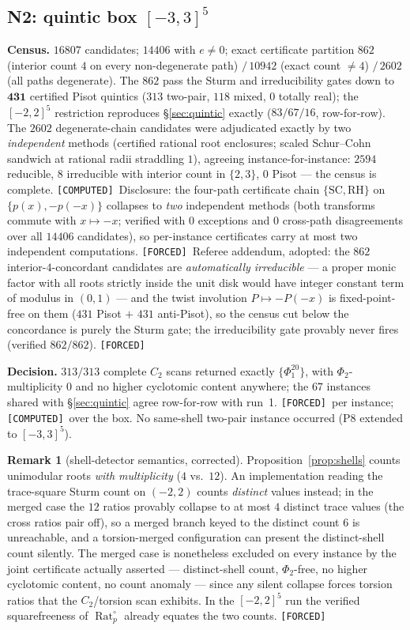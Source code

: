 \documentclass[11pt]{article}
\newcommand{\F}{\textnormal{\texttt{[FORCED]}}}
\newcommand{\C}{\textnormal{\texttt{[COMPUTED]}}}
\newcommand{\Rat}{\operatorname{Rat}}
\theoremstyle{definition}
\newtheorem{remark}[theorem]{Remark}
\begin{document}
\subsection{N2: quintic box $[-3,3]^5$}
\textbf{Census.} $16807$ candidates; $14406$ with $e\neq0$; exact certificate
partition $862$ (interior count $4$ on every non-degenerate path)
$/\,10942$ (exact count $\neq4$) $/\,2602$ (all paths degenerate). The $862$
pass the Sturm and irreducibility gates down to $\mathbf{431}$ certified
Pisot quintics ($313$ two-pair, $118$ mixed, $0$ totally real); the
$[-2,2]^5$ restriction reproduces \S\ref{sec:quintic} exactly ($83/67/16$,
row-for-row). The $2602$ degenerate-chain candidates were adjudicated exactly
by two \emph{independent} methods (certified rational root enclosures;
scaled Schur--Cohn sandwich at rational radii straddling $1$), agreeing
instance-for-instance: $2594$ reducible, $8$ irreducible with interior count
in $\{2,3\}$, $0$ Pisot --- the census is complete. \C\ Disclosure: the
four-path certificate chain $\{\mathrm{SC},\mathrm{RH}\}$ on
$\{p(x),-p(-x)\}$ collapses to \emph{two} independent methods (both
transforms commute with $x\mapsto-x$; verified with $0$ exceptions and $0$
cross-path disagreements over all $14406$ candidates), so per-instance
certificates carry at most two independent computations. \F\ Referee
addendum, adopted: the $862$ interior-$4$-concordant candidates are
\emph{automatically irreducible} --- a proper monic factor with all roots
strictly inside the unit disk would have integer constant term of modulus
in $(0,1)$ --- and the twist involution $P\mapsto-P(-x)$ is fixed-point-free
on them ($431$ Pisot $+$ $431$ anti-Pisot), so the census cut below the
concordance is purely the Sturm gate; the irreducibility gate provably
never fires (verified $862/862$). \F

\textbf{Decision.} $313/313$ complete $C_2$ scans returned exactly
$\{\Phi_1^{20}\}$, with $\Phi_2$-multiplicity $0$ and no higher cyclotomic
content anywhere; the $67$ instances shared with \S\ref{sec:quintic} agree
row-for-row with run~1. \F\ per instance; \C\ over the box. No same-shell
two-pair instance occurred (P8 extended to $[-3,3]^5$).

\begin{remark}[shell-detector semantics, corrected]\label{rem:detector}
Proposition~\ref{prop:shells} counts unimodular roots \emph{with
multiplicity} ($4$ vs.\ $12$). An implementation reading the trace-square
Sturm count on $(-2,2)$ counts \emph{distinct} values instead; in the merged
case the $12$ ratios provably collapse to at most $4$ distinct trace values
(the cross ratios pair off), so a merged branch keyed to the distinct count
$6$ is unreachable, and a torsion-merged configuration can present the
distinct-shell count silently. The merged case is nonetheless excluded on
every instance by the joint certificate actually asserted --- distinct-shell
count, $\Phi_2$-free, no higher cyclotomic content, no count anomaly ---
since any silent collapse forces torsion ratios that the $C_2$/torsion scan
exhibits. In the $[-2,2]^5$ run the verified squarefreeness of
$\Rat_p^{\circ}$ already equates the two counts. \F
\end{remark}
\end{document}
